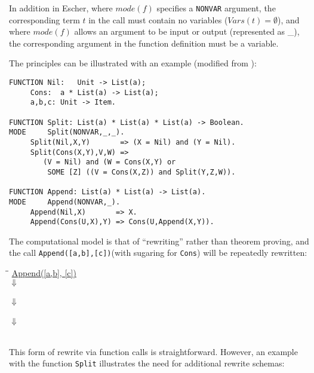 In addition in Escher,  where $\mathit{mode}(f)$ specifies a \texttt{NONVAR} argument, the
corresponding term $t$ in the call must contain no variables ($\mathit{Vars}(t) = \emptyset$),
and where $\mathit{mode}(f)$ allows an argument to be input or output (represented as \_), the
corresponding argument in the function definition must be a variable.

The principles can be illustrated with an example (modified from \cite{Llo94}):

\noindent
\hrulefill
\begin{verbatim}
FUNCTION Nil:   Unit -> List(a);
	 Cons:  a * List(a) -> List(a);
	 a,b,c: Unit -> Item.

FUNCTION Split: List(a) * List(a) * List(a) -> Boolean.
MODE     Split(NONVAR,_,_).
	 Split(Nil,X,Y)       => (X = Nil) and (Y = Nil).
	 Split(Cons(X,Y),V,W) => 
	    (V = Nil) and (W = Cons(X,Y) or
	     SOME [Z] ((V = Cons(X,Z)) and Split(Y,Z,W)).

FUNCTION Append: List(a) * List(a) -> List(a).
MODE     Append(NONVAR,_).
	 Append(Nil,X)       => X.
	 Append(Cons(U,X),Y) => Cons(U,Append(X,Y)).
\end{verbatim}
\hrulefill

The computational model is that of ``rewriting'' rather than theorem proving, and the call
\texttt{Append([a,b],[c])}(with sugaring for \texttt{Cons}) will be repeatedly rewritten:

\begin{ttfamily}
\begin{tabbing}
\hspace*{2cm}\=\hspace{2cm}\=\kill
\>\underline{Append([a,b], [c])}\\
\>\>$\Downarrow$\\
\\
\>\>$\Downarrow$\\
\\
\>\>$\Downarrow$\\
\>[a,b,c]\\
\end{tabbing}
\end{ttfamily}

This form of rewrite via function calls is straightforward.  However, an example with
the function \texttt{Split} illustrates the need for additional rewrite schemas:

